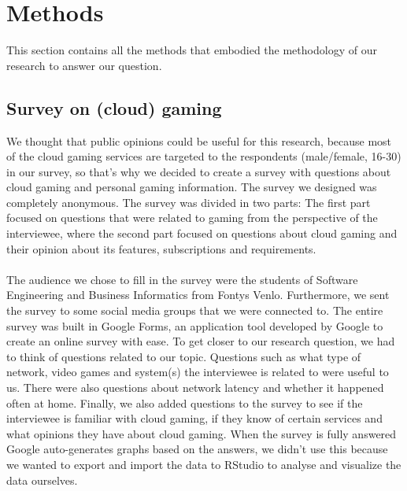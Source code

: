 \section{Methods}
This section contains all the methods that embodied the methodology of our research to answer our question.

\subsection{Survey on (cloud) gaming}
We thought that public opinions could be useful for this research, because most of the cloud gaming services are targeted to the respondents (male/female, 16-30) in our survey, so that's why we decided to create a survey with questions about cloud gaming and personal gaming information. The survey we designed was completely anonymous. The survey was divided in two parts: The first part focused on questions that were related to gaming from the perspective of the interviewee, where the second part focused on questions about cloud gaming and their opinion about its features, subscriptions and requirements.
\\\\
The audience we chose to fill in the survey were the students of Software Engineering and Business Informatics from Fontys Venlo. Furthermore, we sent the survey to some social media groups that we were connected to. The entire survey was built in Google Forms, an application tool developed by Google to create an online survey with ease. To get closer to our research question, we had to think of questions related to our topic. 
Questions such as what type of network, video games and system(s) the interviewee is related to were useful to us. There were also questions about network latency and whether it happened often at home. Finally, we also added questions to the survey to see if the interviewee is familiar with cloud gaming, if they know of certain services and what opinions they have about cloud gaming. When the survey is fully answered Google auto-generates graphs based on the answers, we didn't use this because we wanted to export and import the data to RStudio to analyse and visualize the data ourselves.
\newpage
